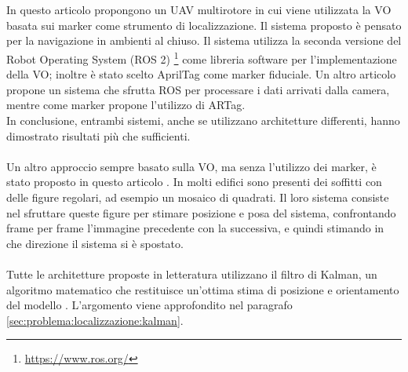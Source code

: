 \\ \\
In questo articolo \cite{s22155798} propongono un UAV multirotore in cui viene utilizzata la VO basata sui marker come strumento di localizzazione. Il sistema proposto è pensato per la navigazione in ambienti al chiuso. Il sistema utilizza la seconda versione del Robot Operating System (ROS 2) \footnote{\url{https://www.ros.org/}} come libreria software per l'implementazione della VO; inoltre è stato scelto AprilTag come marker fiduciale. Un altro articolo \cite{6549921} propone un sistema che sfrutta ROS per processare i dati arrivati dalla camera, mentre come marker propone l'utilizzo di ARTag. \\
In conclusione, entrambi sistemi, anche se utilizzano architetture differenti, hanno dimostrato risultati più che sufficienti.
\\ \\
Un altro approccio sempre basato sulla VO, ma senza l'utilizzo dei marker, è stato proposto in questo articolo \cite{4752770}. In molti edifici sono presenti dei soffitti con delle figure regolari, ad esempio un mosaico di quadrati. Il loro sistema consiste nel sfruttare queste figure per stimare posizione e posa del sistema, confrontando frame per frame l'immagine precedente con la successiva, e quindi stimando in che direzione il sistema si è spostato.
\\ \\
Tutte le architetture proposte in letteratura utilizzano il filtro di Kalman, un algoritmo matematico che restituisce un'ottima stima di posizione e orientamento del modello \cite{CHANG2023104533} \cite{7955787} \cite{8483685} \cite{s22155798} \cite{s19245480}. L'argomento viene approfondito nel paragrafo \ref{sec:problema:localizzazione:kalman}. 

